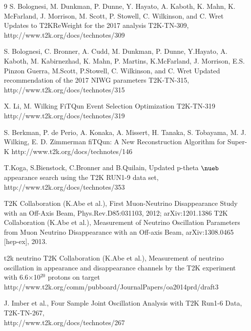 \begin{thebibliography}{9}
  S. Bolognesi, M. Dunkman, P. Dunne, Y. Hayato, A. Kaboth, K. Mahn, K. McFarland, J. Morrison, M. Scott, P. Stowell, C. Wilkinson, and C. Wret
  Updates to T2KReWeight for the 2017 analysis
  T2K-TN-309,\\
  http://www.t2k.org/docs/technotes/309

  S. Bolognesi, C. Bronner, A. Cudd, M. Dunkman, P. Dunne, Y.Hayato, A. Kaboth, M. Kabirnezhad, K. Mahn, P. Martins, K.McFarland, J. Morrison, E.S. Pinzon Guerra, M.Scott, P.Stowell, C. Wilkinson, and C. Wret
  Updated recommendation of the 2017 NIWG parameters
  T2K-TN-315,\\
  http://www.t2k.org/docs/technotes/315

  X. Li, M. Wilking
  FiTQun Event Selection Optimization
  T2K-TN-319
  http://www.t2k.org/docs/technotes/319

  S. Berkman, P. de Perio, A. Konaka, A. Missert, H. Tanaka, S. Tobayama, M. J. Wilking, E. D. Zimmerman
  fiTQun: A New Reconstruction Algorithm for Super-K
  http://www.t2k.org/docs/technotes/146
  
	T.Koga, S.Bienstock, C.Bronner and B.Quilain,
	Updated p-theta $\nueb$ appearance search using the T2K RUN1-9 data set,\\
	http://www.t2k.org/docs/technotes/353

%
%
   T2K Collaboration (K.Abe et al.), 
   First Muon-Neutrino Disappearance Study with an Off-Axis Beam,
   Phys.Rev.D85:031103, 2012; arXiv:1201.1386
  T2K Collaboration (K.Abe et al.),
  Measurement of Neutrino Oscillation Parameters from Muon Neutrino Disappearance with an Off-axis Beam,
  arXiv:1308.0465 [hep-ex], 2013.
  
%
%
t2k neutrino
   T2K Collaboration (K.Abe et al.),
   Measurement of neutrino oscillation in appearance and disappearance channels by the T2K experiment with 
   6.6$\times$10$^{20}$ protons on target 
   http://www.t2k.org/comm/pubboard/JournalPapers/oa2014prd/draft3

%
%
J. Imber et al.,
Four Sample Joint Oscillation Analysis with T2K Run1-6 Data,
  T2K-TN-267,\\
 http://www.t2k.org/docs/technotes/267


\end{thebibliography}
